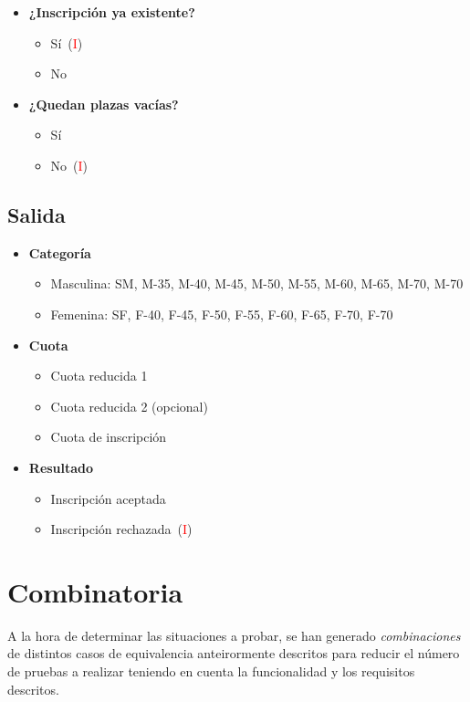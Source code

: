 \begin{itemize}
\begin{itemize}
		\end{itemize}
	\item \textbf{¿Inscripción ya existente?}
			\begin{itemize}
				\item Sí~(\textcolor{red}{I})
				\item No
			\end{itemize}
	\item \textbf{¿Quedan plazas vacías?}
			\begin{itemize}
				\item Sí
				\item No~(\textcolor{red}{I})
			\end{itemize}
\end{itemize}

\subsection{Salida}
\begin{itemize}
	\item \textbf{Categoría}
		\begin{itemize}
			\item Masculina: SM, M-35, M-40, M-45, M-50, M-55, M-60, M-65, M-70, M-70
			\item Femenina: SF, F-40, F-45, F-50, F-55, F-60, F-65, F-70, F-70
		\end{itemize}
	\item \textbf{Cuota}
		\begin{itemize}
			\item Cuota reducida 1
			\item Cuota reducida 2 (opcional)
			\item Cuota de inscripción
		\end{itemize}
	\item \textbf{Resultado}
		\begin{itemize}
			\item Inscripción aceptada
			\item Inscripción rechazada~(\textcolor{red}{I})
		\end{itemize}
\end{itemize}

\section{Combinatoria}
A la hora de determinar las situaciones a probar, se han generado \textit{combinaciones} de
distintos casos de equivalencia anteirormente descritos para reducir el número de pruebas a
realizar teniendo en cuenta la funcionalidad y los requisitos descritos.

